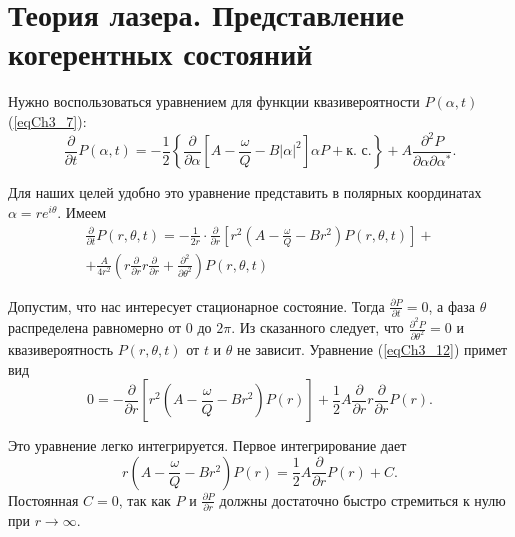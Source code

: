 \section{Теория лазера. Представление когерентных состояний}
Нужно воспользоваться уравнением для функции квазивероятности
$P\left(\alpha, t\right)$ (\ref{eqCh3_7}):
\begin{equation}
\frac{\partial}{\partial t} P\left(\alpha, t\right) = 
- \frac{1}{2}\left\{ 
\frac{\partial}{\partial \alpha}
\left[
A - \frac{\omega}{Q} - B \left|\alpha\right|^2
\right] \alpha P + \mbox{к. с.}
\right\} + 
A \frac{\partial^2 P}{\partial \alpha \partial \alpha^{*}}.
\nonumber
\end{equation} 

Для наших целей удобно это уравнение представить в полярных
координатах $\alpha = r e^{i\theta}$. Имеем 
\begin{eqnarray}
\frac{\partial}{\partial t} P\left(r, \theta, t\right) =
- \frac{1}{2 r} \cdot \frac{\partial}{\partial r}\left[
r^2\left(A - \frac{\omega}{Q} - B r^2\right)P\left(r, \theta,
t\right) 
\right] +
\nonumber \\
+ \frac{A}{4 r^2}
\left(
r \frac{\partial}{\partial r} r \frac{\partial}{\partial r} + 
\frac{\partial^2}{\partial \theta^2}
\right)
P\left(r, \theta, t\right)
\label{eqCh3_12}
\end{eqnarray}

Допустим, что нас интересует стационарное состояние. Тогда $\frac{\partial
  P}{\partial t} = 0$, а фаза $\theta$ распределена равномерно от $0$ до $2
\pi$. Из сказанного следует, что $\frac{\partial^2 P}{\partial
  \theta^2} = 0$ и квазивероятность $P\left(r, \theta, t\right)$ от $t$ и
$\theta$ не зависит. Уравнение (\ref{eqCh3_12}) примет вид   
\begin{equation}
0 = - \frac{\partial}{\partial r}
\left[
r^2\left(A - \frac{\omega}{Q} - B r^2\right)P\left(r\right) 
\right] + 
\frac{1}{2} A \frac{\partial}{\partial r} r \frac{\partial}{\partial
  r} P\left(r\right).
\label{eqCh3_13}
\end{equation}

Это уравнение легко интегрируется. Первое интегрирование дает
\begin{equation}
r\left(A - \frac{\omega}{Q} - B r^2\right)P\left(r\right) 
=
\frac{1}{2} A \frac{\partial}{\partial
  r} P\left(r\right) + C.
\label{eqCh3_14}
\end{equation}
Постоянная  $C = 0$, так как $P$ и $\frac{\partial P}{\partial r}$
должны достаточно быстро стремиться к нулю при  $r \rightarrow
\infty$. 
 
